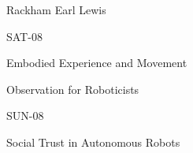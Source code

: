 \documentclass{article}
\begin{document}
\rssheader[1in]

\fontsize{32pt}{36pt}
\selectfont
\begin{center}
Rackham Earl Lewis
\end{center}

\vfill

\fontsize{48pt}{56pt}
\selectfont
\begin{center}
SAT-08
\end{center}

\fontsize{24pt}{28pt}
\selectfont
\begin{center}
Embodied Experience and Movement \par \noindent Observation for Roboticists
\end{center}

\vfill

\fontsize{48pt}{56pt}
\selectfont
\begin{center}
SUN-08
\end{center}

\fontsize{24pt}{24pt}
\selectfont
\begin{center}
Social Trust in Autonomous Robots
\end{center}

\vfill
\end{document}
